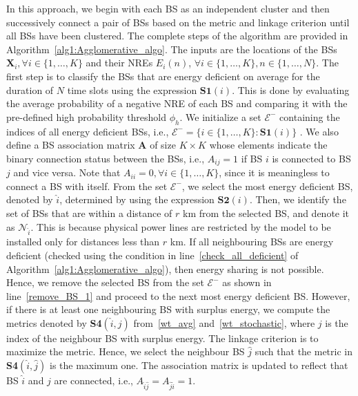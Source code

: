 \documentclass[10pt, letter,twocolumn]{IEEEtran}
\begin{document}
In this approach, we begin with each BS as an independent cluster and then successively connect a pair of BSs based on the metric and linkage criterion until all BSs have been clustered. The complete steps of the algorithm are provided in Algorithm~\ref{alg1:Agglomerative_algo}. The inputs are the locations of the BSs $\mathbf{X}_{i}, \forall i \in \{1,\ldots,K\}$ and their NREs $E_{i}(n)$, $\forall i \in \{1,\ldots,K\}, n \in \{1,\ldots,N\}$. The first step is to classify the BSs that are energy deficient on average for the duration of $N$ time slots using the expression $\textbf{S1}(i)$. This is done by evaluating the average probability of a negative NRE of each BS and comparing it with the pre-defined high probability threshold $\phi_{h}$.
We initialize a set $\mathcal{E}^{-}$ containing the indices of all energy deficient BSs, i.e., $\mathcal{E}^{-}=\{i \in \{1,\ldots,K\} : \textbf{S1}(i)\}$ . We also define a BS association matrix $\mathbf{A}$ of size $K \times K$ whose elements indicate the binary connection status between the BSs, i.e., $A_{ij} = 1$ if BS $i$ is connected to BS $j$ and vice versa. Note that $A_{ii} = 0, \forall i \in \{1,\ldots,K\}$, since it is meaningless to connect a BS with itself. From the set $\mathcal{E}^{-}$, we select the most energy deficient BS, denoted by $\hat{i}$, determined by using the expression $\textbf{S2}(i)$. Then, we identify the set of BSs that are within a distance of $r$ km from the selected BS, and denote it as $\mathcal{N}_{\hat{i}}$. This is because physical power lines are restricted by the model to be installed only for distances less than $r$ km. If all neighbouring BSs are energy deficient (checked using the condition in line~\ref{check_all_deficient} of Algorithm~\ref{alg1:Agglomerative_algo}), then energy sharing is not possible. Hence, we remove the selected BS from the set $\mathcal{E}^{-}$ as shown in line~\ref{remove_BS_1} and proceed to the next most energy deficient BS. However, if there is at least one neighbouring BS with surplus energy, we compute the metrics denoted by \textbf{S4}$(\hat{i},j)$ from~\eqref{wt_avg} and~\eqref{wt_stochastic}, where $j$ is the index of the neighbour BS with surplus energy.
The linkage criterion is to maximize the metric. Hence, we select the neighbour BS $\hat{j}$ such that the metric in \textbf{S4}$(\hat{i},\hat{j})$ is the maximum one. The association matrix is updated to reflect that BS $\hat{i}$ and $\hat{j}$ are connected, i.e., $A_{\hat{i}\hat{j}} = A_{\hat{j}\hat{i}} = 1$.
\end{document}
